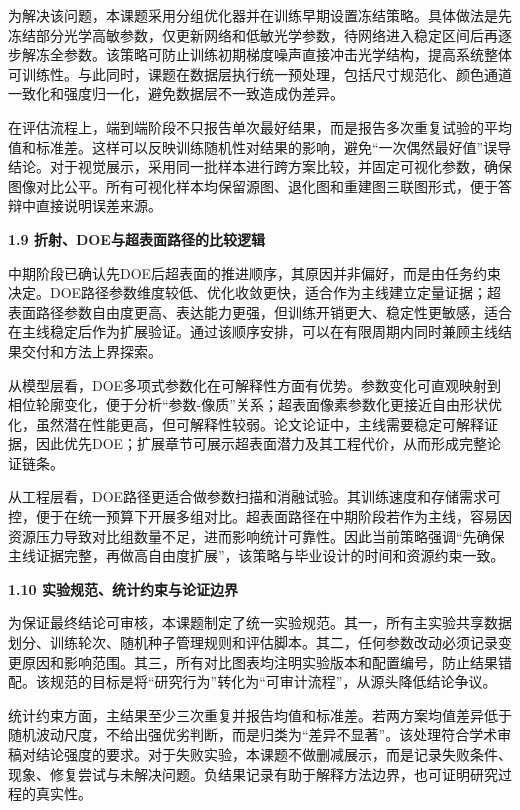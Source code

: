 \documentclass[UTF8,12pt,fontset=fandol]{ctexart}
\newcommand{\hfirst}[1]{%
\vspace{0.6em}
\noindent\textbf{#1}\par
}
\begin{document}
为解决该问题，本课题采用分组优化器并在训练早期设置冻结策略。具体做法是先冻结部分光学高敏参数，仅更新网络和低敏光学参数，待网络进入稳定区间后再逐步解冻全参数。该策略可防止训练初期梯度噪声直接冲击光学结构，提高系统整体可训练性。与此同时，课题在数据层执行统一预处理，包括尺寸规范化、颜色通道一致化和强度归一化，避免数据层不一致造成伪差异。



在评估流程上，端到端阶段不只报告单次最好结果，而是报告多次重复试验的平均值和标准差。这样可以反映训练随机性对结果的影响，避免“一次偶然最好值”误导结论。对于视觉展示，采用同一批样本进行跨方案比较，并固定可视化参数，确保图像对比公平。所有可视化样本均保留源图、退化图和重建图三联图形式，便于答辩中直接说明误差来源。



\hfirst{1.9 折射、DOE与超表面路径的比较逻辑}

中期阶段已确认先DOE后超表面的推进顺序，其原因并非偏好，而是由任务约束决定。DOE路径参数维度较低、优化收敛更快，适合作为主线建立定量证据；超表面路径参数自由度更高、表达能力更强，但训练开销更大、稳定性更敏感，适合在主线稳定后作为扩展验证。通过该顺序安排，可以在有限周期内同时兼顾主线结果交付和方法上界探索。



从模型层看，DOE多项式参数化在可解释性方面有优势。参数变化可直观映射到相位轮廓变化，便于分析“参数-像质”关系；超表面像素参数化更接近自由形状优化，虽然潜在性能更高，但可解释性较弱。论文论证中，主线需要稳定可解释证据，因此优先DOE；扩展章节可展示超表面潜力及其工程代价，从而形成完整论证链条。



从工程层看，DOE路径更适合做参数扫描和消融试验。其训练速度和存储需求可控，便于在统一预算下开展多组对比。超表面路径在中期阶段若作为主线，容易因资源压力导致对比组数量不足，进而影响统计可靠性。因此当前策略强调“先确保主线证据完整，再做高自由度扩展”，该策略与毕业设计的时间和资源约束一致。



\hfirst{1.10 实验规范、统计约束与论证边界}

为保证最终结论可审核，本课题制定了统一实验规范。其一，所有主实验共享数据划分、训练轮次、随机种子管理规则和评估脚本。其二，任何参数改动必须记录变更原因和影响范围。其三，所有对比图表均注明实验版本和配置编号，防止结果错配。该规范的目标是将“研究行为”转化为“可审计流程”，从源头降低结论争议。



统计约束方面，主结果至少三次重复并报告均值和标准差。若两方案均值差异低于随机波动尺度，不给出强优劣判断，而是归类为“差异不显著”。该处理符合学术审稿对结论强度的要求。对于失败实验，本课题不做删减展示，而是记录失败条件、现象、修复尝试与未解决问题。负结果记录有助于解释方法边界，也可证明研究过程的真实性。
\end{document}
